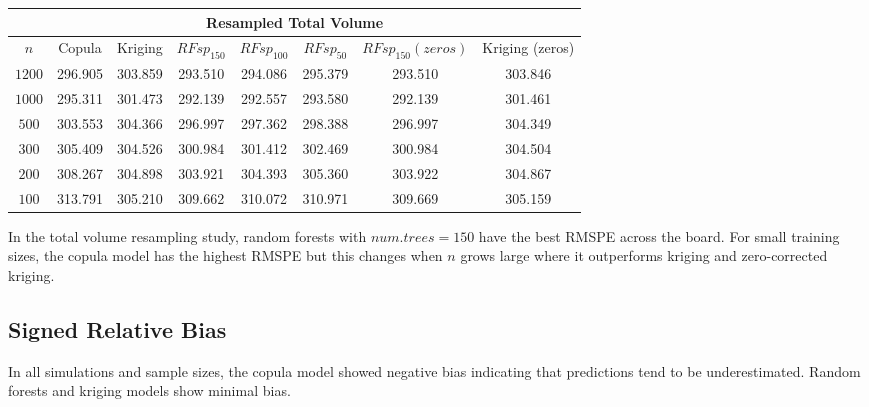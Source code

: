 \documentclass{article}
\begin{document}
\begin{center}
	\begin{singlespace}
\begin{tabular}{|| c | c c c c c c c ||}
\hline
\multicolumn{8}{||c||}{Resampled Total Volume} \\
\hline
$n$ & Copula & Kriging & $RFsp_{150}$ & $RFsp_{100}$ & $RFsp_{50}$ & $RFsp_{150}(zeros)$ & Kriging (zeros) \\ [.5ex] 
\hline\hline
$1200$ & 296.905 & \cellcolor{gray}303.859 & \cellcolor{cyan}293.510 & 294.086 & 295.379 & \cellcolor{cyan}293.510 & 303.846 \\
$1000$ & 295.311 & \cellcolor{gray}301.473 & \cellcolor{cyan}292.139 & 292.557 & 293.580 & \cellcolor{cyan}292.139 & 301.461 \\
$500$ & 303.553 & \cellcolor{gray}304.366 & \cellcolor{cyan}296.997 & 297.362 & 298.388 & \cellcolor{cyan}296.997 & 304.349 \\
$300$ & \cellcolor{gray}305.409 & 304.526 & \cellcolor{cyan}300.984 & 301.412 & 302.469 & \cellcolor{cyan}300.984 & 304.504 \\
$200$ & \cellcolor{gray}308.267 & 304.898 & \cellcolor{cyan}303.921 & 304.393 & 305.360 & 303.922 & 304.867 \\
$100$ & \cellcolor{gray}313.791 & 305.210 & \cellcolor{cyan}309.662 & 310.072 & 310.971 & 309.669 & 305.159 \\ [.5ex] 
\hline
\end{tabular}
\end{singlespace}
\end{center}

In the total volume resampling study, random forests with $num.trees=150$ have the best RMSPE across the board.
For small training sizes, the copula model has the highest RMSPE but this changes when $n$ grows large where it outperforms kriging and zero-corrected kriging.

\subsection{Signed Relative Bias}

In all simulations and sample sizes, the copula model showed negative bias indicating that predictions tend to be underestimated.
Random forests and kriging models show minimal bias.
\end{document}
